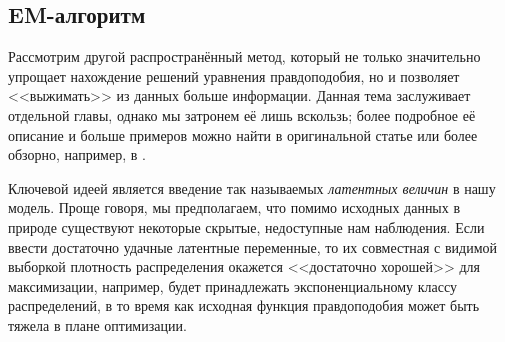 \subsection{EM-алгоритм}

Рассмотрим другой распространённый метод, который не только значительно упрощает нахождение решений уравнения правдоподобия, но и позволяет <<выжимать>> из данных больше информации. Данная тема заслуживает отдельной главы, однако мы затронем её лишь вскользь; более подробное её описание и больше примеров можно найти в оригинальной статье \cite{dempster1977maximum} или более обзорно, например, в \cite{murphy2022probabilistic}.

Ключевой идеей является введение так называемых \textit{латентных величин} в нашу модель. Проще говоря, мы предполагаем, что помимо исходных данных в природе существуют некоторые скрытые, недоступные нам наблюдения. Если ввести достаточно удачные латентные переменные, то их совместная с видимой выборкой плотность распределения окажется <<достаточно хорошей>> для максимизации, например, будет принадлежать экспоненциальному классу распределений, в то время как исходная функция правдоподобия может быть тяжела в плане оптимизации. 

